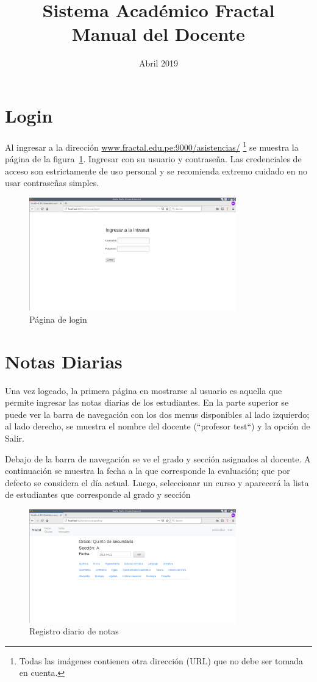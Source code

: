 \documentclass[12pt]{article}
\title{Sistema Acad\'emico Fractal\\Manual del Docente}
\date{Abril 2019}
\begin{document}
\maketitle

\section{Login}
Al ingresar a la direcci\'on \url{www.fractal.edu.pe:9000/asistencias/} 
\footnote{Todas las im\'agenes contienen otra direcci\'on (URL) que no debe ser tomada en cuenta.}
se muestra la p\'agina de la figura~\ref{fig:login}.
Ingresar con su usuario y contrase\~na. Las credenciales de acceso son estrictamente de uso personal y
se recomienda extremo cuidado en no usar contrase\~nas simples.
\begin{figure}[ht]
  \centering
  \includegraphics[width=0.8\textwidth]{images/login.png}
  \caption{P\'agina de login}
  \label{fig:login}
\end{figure}

\section{Notas Diarias}
Una vez logeado, la primera p\'agina en mostrarse al usuario es aquella que permite ingresar las notas
diarias de los estudiantes. En la parte superior se puede ver la barra de navegaci\'on con los dos menus
disponibles al lado izquierdo; al lado derecho, se muestra el nombre del docente (``profesor test``) y
la opci\'on de Salir.

Debajo de la barra de navegaci\'on se ve el grado y secci\'on asignados al docente. A continuaci\'on se
muestra la fecha a la que corresponde la evaluaci\'on; que por defecto se considera el d\'ia actual. 
Luego, seleccionar un curso y aparecer\'a la lista de estudiantes que corresponde al grado y secci\'on
\begin{figure}[ht]
  \centering
  \includegraphics[width=0.8\textwidth]{images/profesor1.png}
  \caption{Registro diario de notas}
  \label{fig:profesor1}
\end{figure}
\end{document}

